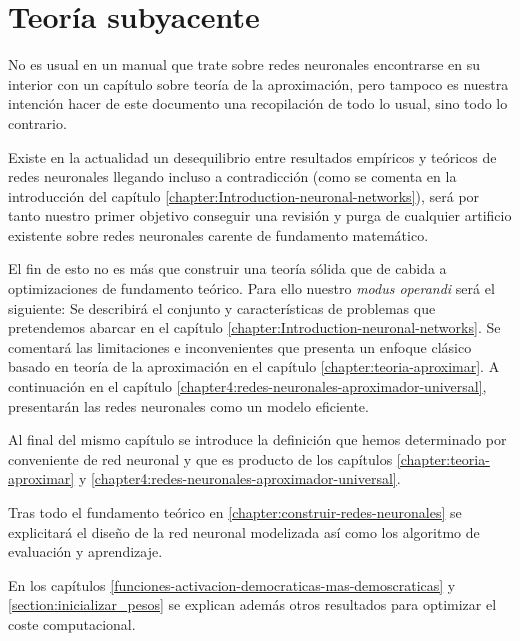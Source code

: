 
\part{Teoría subyacente}

No es usual en un manual que trate sobre redes neuronales encontrarse en su interior con un 
capítulo sobre teoría de la aproximación, pero tampoco es nuestra intención
hacer de este documento una recopilación de todo lo usual, sino todo lo contrario.

Existe en la actualidad un desequilibrio entre resultados empíricos y teóricos de redes neuronales llegando incluso a contradicción (como se comenta en la introducción del capítulo \ref{chapter:Introduction-neuronal-networks}), será por tanto
nuestro primer objetivo conseguir una revisión y purga de cualquier artificio existente sobre redes neuronales carente de fundamento matemático. 

El fin de esto no es más que construir una teoría sólida que de cabida a optimizaciones de 
fundamento teórico.  Para ello nuestro \textit{modus operandi} será el siguiente: 
Se describirá el conjunto y características de problemas que pretendemos abarcar  en el capítulo \ref{chapter:Introduction-neuronal-networks}. 
Se comentará las limitaciones e inconvenientes que presenta un enfoque clásico 
basado en teoría de la aproximación en el capítulo \ref{chapter:teoria-aproximar}.
A continuación en el capítulo \ref{chapter4:redes-neuronales-aproximador-universal}, 
presentarán las redes neuronales como un modelo eficiente.
 
Al final del mismo capítulo se introduce la definición que hemos determinado por conveniente de red neuronal y que es producto de los capítulos 
\ref{chapter:teoria-aproximar} y \ref{chapter4:redes-neuronales-aproximador-universal}.
 
Tras todo el fundamento teórico en \ref{chapter:construir-redes-neuronales} se explicitará el diseño de la red neuronal modelizada así como los algoritmo de evaluación y aprendizaje.

En los capítulos \ref{funciones-activacion-democraticas-mas-demoscraticas} y \ref{section:inicializar_pesos} se explican además otros resultados para optimizar el coste computacional.